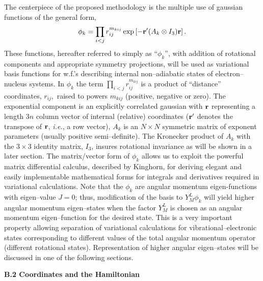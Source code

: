 {{The centerpiece of the 
proposed methodology is the multiple use of 
gaussian functions of the
general form, 
\begin{equation}
\phi _k=\prod_{i<j}r_{ij}^{m_{kij}}\exp \left[ -{\bf r}^{\prime
}(A_k\otimes I_3){\bf r}\right] .  
\label{basisfcn}
\end{equation}
These functions, hereafter referred to simply as ``$\phi_k$'', 
with addition of rotational components
and appropriate symmetry projections, will be used as variational basis
functions for w.f.'s describing internal non--adiabatic
states of electron--nucleus systems. In $\phi_k$ 
the term $\prod_{i<j}r_{ij}^{m_{kij}}$ is a product of ``distance''
coordinates, $r_{ij},$ raised to powers $m_{kij}$ (positive, negative
\cite{kpc}
or zero).
The exponential component is an explicitly correlated gaussian with $%
{\bf r}$ representing a length $3n$ column vector of internal (relative)
coordinates (${\bf r}^{\prime }$ denotes the transpose of ${\bf r}$,
{\it i.e.}, a row vector), $A_k$ is an 
$N\times N$ symmetric matrix of exponent
parameters (usually positive semi--definite). The Kronecker product of
$A_k$
with the $3\times 3$ identity matrix, $I_3$, insures rotational invariance
as will be shown in a later section. The matrix/vector form of $\phi _k$
allows us to exploit the powerful 
matrix differential calculus, described by
Kinghorn\cite{Kinghorn95a}, for deriving 
elegant and easily implementable
mathematical forms for integrals and 
derivatives required in variational
calculations.
Note that 
the $\phi _k$ are angular momentum eigen-functions
with eigen--value $J=0$; thus, 
modification of the basis to $Y_M^L\phi _k$
will yield higher angular momentum 
eigen--states when the factor $Y_M^L$ is
chosen as an angular momentum 
eigen--function for the desired state.
This is a very important property 
allowing separation of variational calculations 
for vibrational--electronic states 
corresponding to different
values of the total angular 
momentum operator (different rotational states).
Representation of higher angular 
eigen--states will be discussed in 
one of the following sections.



\vspace{2mm}
\noindent
{\bf B.2 Coordinates and the Hamiltonian}

}}
